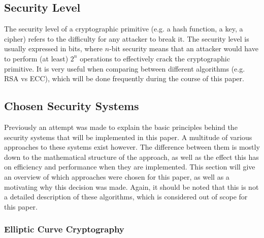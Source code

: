 \documentclass[master=cws,masteroption=vs,english]{kulemt}
\begin{document}
\subsection{Security Level}
\label{sec:security_level}

The security level of a cryptographic primitive (e.g. a hash function, a key, a cipher) refers to the difficulty for any attacker to break it. The security level is usually expressed in bits, where $n$-bit security means that an attacker would have to perform (at least) $2^n$ operations to effectively crack the cryptographic primitive. It is very useful when comparing between different algorithms (e.g. RSA vs ECC), which will be done frequently during the course of this paper.

\subsection{Chosen Security Systems}
Previously an attempt was made to explain the basic principles behind the security systems that will be implemented in this paper. A multitude of various approaches to these systems exist however. The difference between them is mostly down to the mathematical structure of the approach, as well as the effect this has on efficiency and performance when they are implemented. This section will give an overview of which approaches were chosen for this paper, as well as a motivating why this decision was made. Again, it should be noted that this is not a detailed description of these algorithms, which is considered out of scope for this paper.

\subsubsection{Elliptic Curve Cryptography}
\label{sec:ECC}
\end{document}
